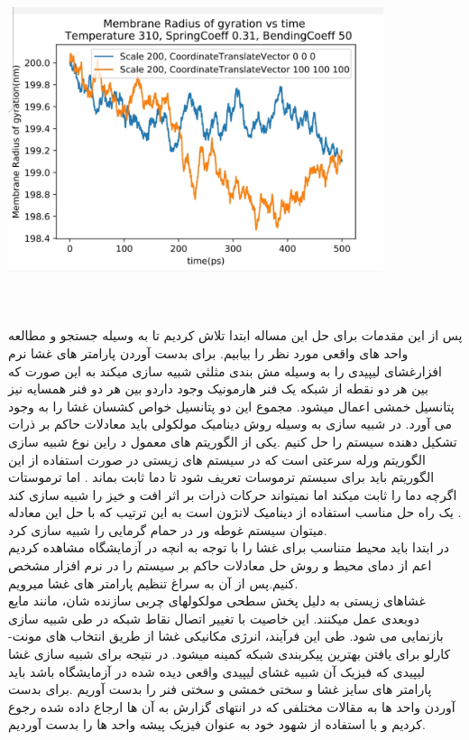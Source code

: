 \documentclass[12pt,onecolumn,a4paper]{report}
\begin{document}
\begin{center}
\includegraphics[width=11cm, height=9cm]{20210215_142645.jpg}
\end{center}\\
پس از این مقدمات
برای حل این مساله ابتدا تلاش کردیم تا به وسیله جستجو و مطالعه واحد های واقعی مورد نظر را بیابیم. برای بدست آوردن پارامتر های غشا نرم افزارغشای لیپیدی را به وسیله مش بندی مثلثی شبیه سازی میکند به این صورت که بین هر دو نقطه از شبکه یک فنر هارمونیک وجود داردو بین هر دو فنر همسایه نیز پتانسیل خمشی اعمال میشود. مجموع این دو پتانسیل خواص کشسان غشا را به وجود می آورد.
در شبیه سازی به وسیله روش دینامیک مولکولی باید معادلات حاکم بر ذرات تشکیل دهنده سیستم را حل کنیم .یکی از الگوریتم های معمول د راین نوع شبیه سازی الگوریتم ورله سرعتی است که در سیستم های زیستی  در صورت استفاده از این الگوریتم باید برای سیستم ترموسات تعریف شود تا دما ثابت بماند . اما ترموستات اگرچه دما را ثابت میکند اما نمیتواند  حرکات ذرات بر اثر افت و خیز را شبیه سازی کند . یک راه حل مناسب استفاده از دینامیک لانژون است به این ترتیب که با حل این معادله میتوان سیستم غوطه ور در حمام گرمایی را شبیه سازی کرد.\\
در ابتدا باید محیط متناسب برای غشا را با توجه به انچه در آزمایشگاه مشاهده کردیم اعم از دمای محیط و روش حل معادلات حاکم بر سیستم را  در نرم افزار مشخص کنیم.پس از آن به سراغ تنظیم پارامتر های غشا میرویم.\\
غشاهای زیستی به دلیل پخش سطحی مولکولهای
چربی سازنده شان، مانند مایع دوبعدی عمل میکنند. این خاصیت با تغییر اتصال نقاط شبکه
در طی شبیه سازی بازنمایی می شود. طی این فرآیند، انرژی مکانیکی غشا از طریق انتخاب های
مونت-کارلو برای یافتن بهترین پیکربندی شبکه کمینه میشود.
در نتیجه برای شبیه سازی غشا لیپیدی که فیزیک آن شبیه غشای لیپیدی واقعی دیده شده در آزمایشگاه باشد باید پارامتر های سایز غشا  و سختی خمشی و سختی فنر را بدست آوریم .برای بدست آوردن واحد ها به مقالات مختلفی که در انتهای گزارش به آن ها ارجاع داده شده رجوع کردیم و با استفاده از شهود خود به عنوان فیزیک پیشه واحد ها را بدست آوردیم.\\
\end{document}
